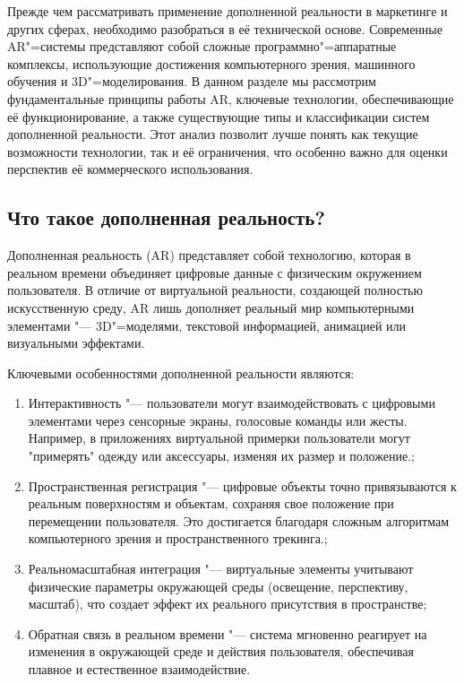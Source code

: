 Прежде чем рассматривать применение дополненной реальности в маркетинге и других сферах, необходимо разобраться в её технической основе. Современные AR"=системы представляют собой сложные программно"=аппаратные комплексы, использующие достижения компьютерного зрения, машинного обучения и 3D"=моделирования. В данном разделе мы рассмотрим фундаментальные принципы работы AR, ключевые технологии, обеспечивающие её функционирование, а также существующие типы и классификации систем дополненной реальности. Этот анализ позволит лучше понять как текущие возможности технологии, так и её ограничения, что особенно важно для оценки перспектив её коммерческого использования.

\subsection{Что такое дополненная реальность?}
Дополненная реальность (AR) представляет собой технологию, которая в реальном времени объединяет цифровые данные с физическим окружением пользователя. В отличие от виртуальной реальности, создающей полностью искусственную среду, AR лишь дополняет реальный мир компьютерными элементами "--- 3D"=моделями, текстовой информацией, анимацией или визуальными эффектами.

Ключевыми особенностями дополненной реальности являются:
\begin{enumerate}
	\item Интерактивность "--- пользователи могут взаимодействовать с цифровыми элементами через сенсорные экраны, голосовые команды или жесты. Например, в приложениях виртуальной примерки пользователи могут "примерять" одежду или аксессуары, изменяя их размер и положение.;
	\item Пространственная регистрация "--- цифровые объекты точно привязываются к реальным поверхностям и объектам, сохраняя свое положение при перемещении пользователя. Это достигается благодаря сложным алгоритмам компьютерного зрения и пространственного трекинга.;
	\item Реальномасштабная интеграция "--- виртуальные элементы учитывают физические параметры окружающей среды (освещение, перспективу, масштаб), что создает эффект их реального присутствия в пространстве;
	\item Обратная связь в реальном времени "--- система мгновенно реагирует на изменения в окружающей среде и действия пользователя, обеспечивая плавное и естественное взаимодействие.
\end{enumerate}

